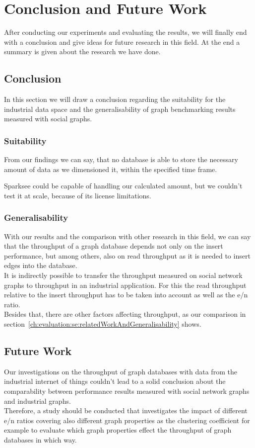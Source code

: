 \chapter{Conclusion and Future Work}
\label{ch:futureWork}
After conducting our experiments and evaluating the results,
we will finally end with a conclusion and give ideas for future research in this field.
At the end a summary is given about the research we have done.

\section{Conclusion}
\label{ch:futureWork:se:conclusion}
In this section we will draw a conclusion regarding the suitability for the industrial data space and the generalisability of graph benchmarking results measured with social graphs.

\subsection{Suitability}
From our findings we can say,
that no database is able to store the necessary amount of data as we dimensioned it,
within the specified time frame.

Sparksee could be capable of handling our calculated amount,
but we couldn't test it at scale,
because of its license limitations.

\subsection{Generalisability}
With our results and the comparison with other research in this field,
we can say that the throughput of a graph database depends not only on the insert performance,
but among others,
also on read throughput as it is needed to insert edges into the database.\\
It is indirectly possible to transfer the throughput measured on social network graphs to throughput in an industrial application.
For this the read throughput relative to the insert throughput has to be taken into account as well as the e/n ratio.\\
Besides that, there are other factors affecting throughput,
as our comparison in section~\ref{ch:evaluation:se:relatedWorkAndGeneralisability} shows.

\section{Future Work}
Our investigations on the throughput of graph databases with data from the industrial internet of things couldn't lead to a solid conclusion about the comparability between performance results measured with social network graphs and industrial graphs.\\
Therefore,
a study should be conducted that investigates the impact of different e/n ratios covering also different graph properties as the clustering coefficient for example to evaluate which graph properties effect the throughput of graph databases in which way.

